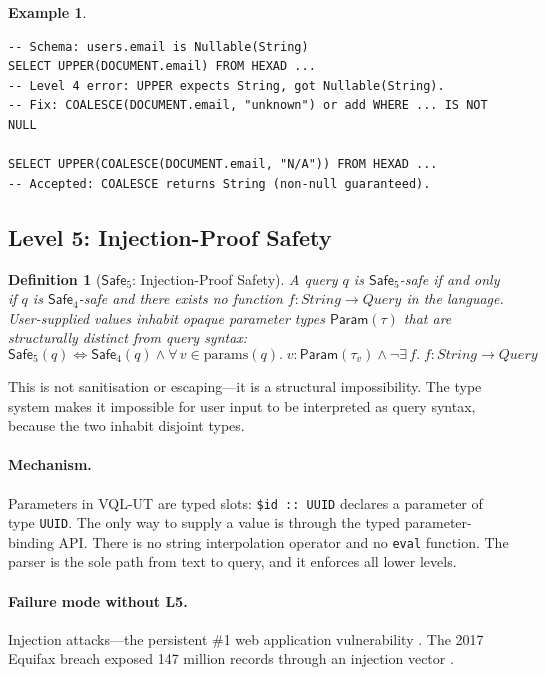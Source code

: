 \documentclass[11pt,a4paper]{article}
\newtheorem{definition}[theorem]{Definition}
\newtheorem{example}[theorem]{Example}
\newcommand{\VQL}{\textsc{VQL-UT}}
\newcommand{\LevelN}[1]{\textsf{L#1}}
\newcommand{\Safe}[1]{\ensuremath{\mathsf{Safe}_{#1}}}
\begin{document}
\begin{example}
\begin{lstlisting}[language=VQL]
-- Schema: users.email is Nullable(String)
SELECT UPPER(DOCUMENT.email) FROM HEXAD ...
-- Level 4 error: UPPER expects String, got Nullable(String).
-- Fix: COALESCE(DOCUMENT.email, "unknown") or add WHERE ... IS NOT NULL

SELECT UPPER(COALESCE(DOCUMENT.email, "N/A")) FROM HEXAD ...
-- Accepted: COALESCE returns String (non-null guaranteed).
\end{lstlisting}
\end{example}

\subsection{Level 5: Injection-Proof Safety}\label{sec:L5}

\begin{definition}[\Safe{5}: Injection-Proof Safety]
A query $q$ is \Safe{5}-safe if and only if $q$ is \Safe{4}-safe and
there exists no function $f : \mathit{String} \to \mathit{Query}$ in
the language.  User-supplied values inhabit opaque parameter types
$\mathsf{Param}(\tau)$ that are structurally distinct from query syntax:
\[
  \Safe{5}(q) \iff \Safe{4}(q) \land
  \forall\, v \in \mathrm{params}(q).\; v : \mathsf{Param}(\tau_v) \land
  \neg \exists\, f.\; f : \mathit{String} \to \mathit{Query}
\]
\end{definition}

This is not sanitisation or escaping---it is a structural
impossibility.  The type system makes it impossible for user input to
be interpreted as query syntax, because the two inhabit disjoint types.

\paragraph{Mechanism.}
Parameters in \VQL{} are typed slots: \texttt{\$id :: UUID} declares a
parameter of type \texttt{UUID}.  The only way to supply a value is
through the typed parameter-binding API.  There is no string
interpolation operator and no \texttt{eval} function.  The parser is
the sole path from text to query, and it enforces all lower levels.

\paragraph{Failure mode without \LevelN{5}.}
Injection attacks---the persistent \#1 web application vulnerability
\citep{owasp2021top10}.  The 2017 Equifax breach exposed 147 million
records through an injection vector \citep{usgao2018equifax}.
\end{document}
